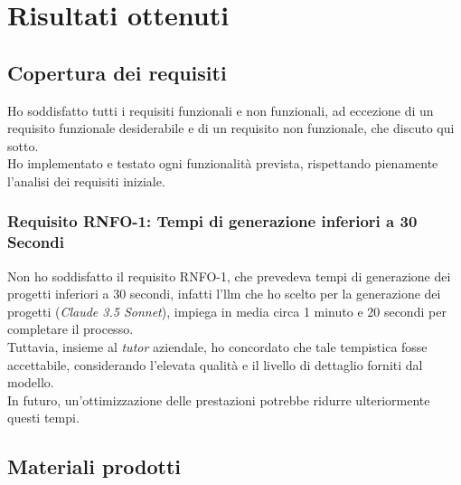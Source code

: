 \pagebreak \section{Risultati ottenuti}
\label{sez:risultati-ottenuti}


\pagebreak
\subsection{Copertura dei requisiti}
\label{subsec:copertura-requisiti}

Ho soddisfatto tutti i requisiti funzionali e non funzionali, ad eccezione di un requisito funzionale desiderabile e di un requisito non funzionale, che discuto qui sotto.\\
Ho implementato e testato ogni funzionalità prevista, rispettando pienamente l'analisi dei requisiti iniziale.

\subsubsection{Requisito RNFO-1: Tempi di generazione inferiori a 30 Secondi}
\noindent Non ho soddisfatto il requisito RNFO-1, che prevedeva tempi di generazione dei progetti inferiori a 30 secondi,
infatti l'\gls{llm} che ho scelto per la generazione dei progetti (\textit{Claude 3.5 Sonnet}), impiega in media circa 1 minuto e 20 secondi per completare il processo.\\

\noindent Tuttavia, insieme al \textit{tutor} aziendale, ho concordato che tale tempistica fosse accettabile, considerando l'elevata qualità e il livello di dettaglio forniti dal modello.\\
In futuro, un'ottimizzazione delle prestazioni potrebbe ridurre ulteriormente questi tempi.
\subsection{Materiali prodotti}
\label{subsec:materiali-prodotti}

